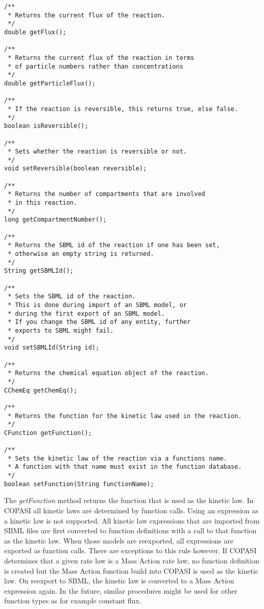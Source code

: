 \documentclass[a4,10pt]{article}
\begin{document}
\begin{lstlisting}
/**
 * Returns the current flux of the reaction.
 */
double getFlux();

/**
 * Returns the current flux of the reaction in terms 
 * of particle numbers rather than concentrations
 */
double getParticleFlux();

/**
 * If the reaction is reversible, this returns true, else false.
 */
boolean isReversible();

/**
 * Sets whether the reaction is reversible or not.
 */
void setReversible(boolean reversible);

/**
 * Returns the number of compartments that are involved
 * in this reaction.
 */
long getCompartmentNumber();

/**
 * Returns the SBML id of the reaction if one has been set,
 * otherwise an empty string is returned.
 */
String getSBMLId();

/**
 * Sets the SBML id of the reaction.
 * This is done during import of an SBML model, or
 * during the first export of an SBML model.
 * If you change the SBML id of any entity, further 
 * exports to SBML might fail.
 */
void setSBMLId(String id);

/**
 * Returns the chemical equation object of the reaction.
 */
CChemEq getChemEq();

/**
 * Returns the function for the kinetic law used in the reaction.
 */
CFunction getFunction();

/**
 * Sets the kinetic law of the reaction via a functions name.
 * A function with that name must exist in the function database.
 */
boolean setFunction(String functionName);
\end{lstlisting}

The \textit{getFunction} method returns the function that is used as the kinetic law. In COPASI all kinetic laws are determined by function calls. Using an expression as a kinetic law is not supported. All kinetic law expressions that are imported from SBML files are first converted to function definitions with a call to that function as the kinetic law. When those models are reexported, all expressions are exported as function calls.
There are exceptions to this rule however. If COPASI determines that a given rate law is a Mass Action rate law, no function definition is created but the Mass Action function build into COPASI is used as the kinetic law. On reexport to SBML, the kinetic law is converted to a Mass Action expression again. In the future, similar procedures might be used for other function types as for example constant flux.
\end{document}
